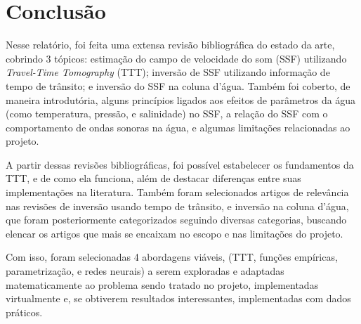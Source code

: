 \section{Conclusão}

Nesse relatório, foi feita uma extensa revisão bibliográfica do estado da arte, cobrindo 3 tópicos: estimação do campo de velocidade do som (SSF) utilizando \textsl{Travel-Time Tomography} (TTT); inversão de SSF utilizando informação de tempo de trânsito; e inversão do SSF na coluna d'água. Também foi coberto, de maneira introdutória, alguns princípios ligados aos efeitos de parâmetros da água (como temperatura, pressão, e salinidade) no SSF, a relação do SSF com o comportamento de ondas sonoras na água, e algumas limitações relacionadas ao projeto.

A partir dessas revisões bibliográficas, foi possível estabelecer os fundamentos da TTT, e de como ela funciona, além de destacar diferenças entre suas implementações na literatura. Também foram selecionados artigos de relevância nas revisões de inversão usando tempo de trânsito, e inversão na coluna d'água, que foram posteriormente categorizados seguindo diversas categorias, buscando elencar os artigos que mais se encaixam no escopo e nas limitações do projeto.

Com isso, foram selecionadas 4 abordagens viáveis, (TTT, funções empíricas, parametrização, e redes neurais) a serem exploradas e adaptadas matematicamente ao problema sendo tratado no projeto, implementadas virtualmente e, se obtiverem resultados interessantes, implementadas com dados práticos.